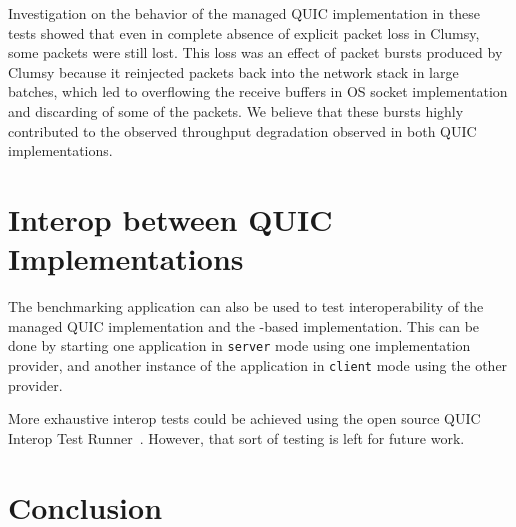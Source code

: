 Investigation on the behavior of the managed QUIC implementation in these tests showed that even in
complete absence of explicit packet loss in Clumsy, some packets were still lost. This loss was an
effect of packet bursts produced by Clumsy because it reinjected packets back into the network stack
in large batches, which led to overflowing the receive buffers in OS socket implementation and
discarding of some of the packets. We believe that these bursts highly contributed to the observed
throughput degradation observed in both QUIC implementations.






\section{Interop between QUIC Implementations}

The benchmarking application can also be used to test interoperability of the managed QUIC
implementation and the \libmsquic{}-based implementation. This can be done by starting one
application in \texttt{server} mode using one implementation provider, and another instance of the
application in \texttt{client} mode using the other provider.

More exhaustive interop tests could be achieved using the open source QUIC Interop Test
Runner~\cite{QuicInteropRunner}. However, that sort of testing is left for future work.

\section{Conclusion}

